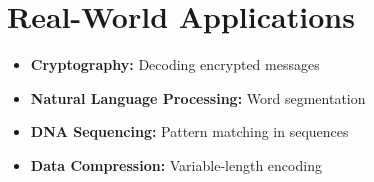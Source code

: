 \section*{Real-World Applications}
\begin{itemize}
    \item \textbf{Cryptography:} Decoding encrypted messages
    \item \textbf{Natural Language Processing:} Word segmentation
    \item \textbf{DNA Sequencing:} Pattern matching in sequences
    \item \textbf{Data Compression:} Variable-length encoding
\end{itemize}

\printindex